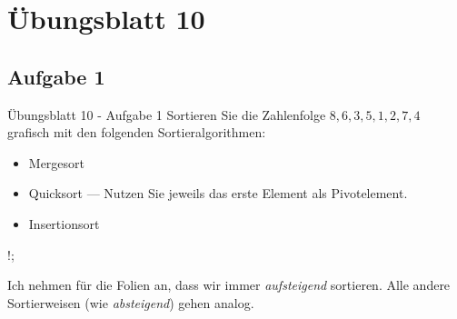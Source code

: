 \section{Übungsblatt 10}
\subsection{Aufgabe 1}
\iffull
\begin{frame}[c,fragile]{Übungsblatt 10 - Aufgabe 1}
    \pause Sortieren Sie die Zahlenfolge \(8, 6, 3, 5, 1, 2, 7, 4\) grafisch mit den folgenden Sortieralgorithmen:
    \begin{itemize}[<+(1)->]
        \item Mergesort
        \item Quicksort --- Nutzen Sie jeweils das erste Element als Pivotelement.
        \item Insertionsort
    \end{itemize}
    \bigskip\par\pause

    \resizebox{2cm}!{\pingu[eyes wink,left wing wave, sign post left={Note!}];}\hfill\parbox{\linewidth-2cm}{%
    Ich nehmen für die Folien an, dass wir immer \textit{aufsteigend} sortieren. Alle andere Sortierweisen (wie \textit{absteigend}) gehen analog.}
\end{frame}
\fi

